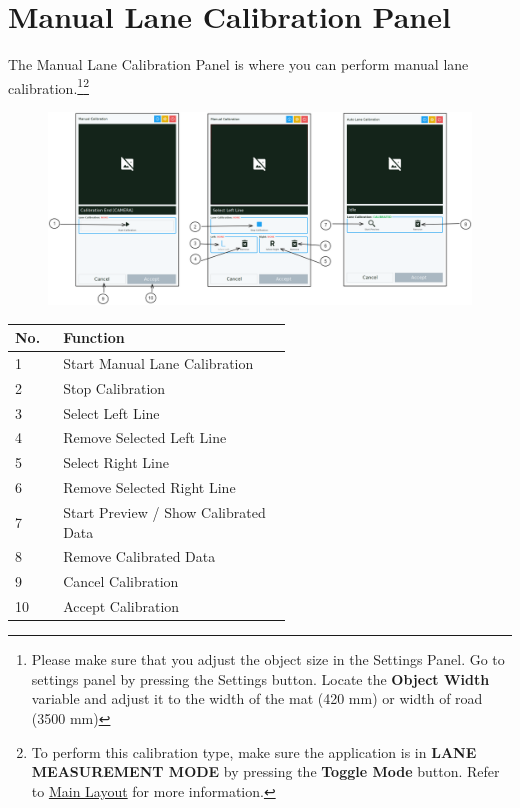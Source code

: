 \pagebreak
\section{Manual Lane Calibration Panel}
\label{sec:manual-lane-calibration-panel}

The Manual Lane Calibration Panel is where you can perform manual lane calibration.\footnote{Please make sure that you adjust the object size in the Settings Panel. Go to settings panel by pressing the Settings button. Locate the \textbf{Object Width} variable and adjust it to the width of the mat (420 mm) or width of road (3500 mm)}\footnote{To perform this calibration type, make sure the application is in \textbf{LANE MEASUREMENT MODE} by pressing the \textbf{Toggle Mode} button. Refer to \hyperref[sec:main-layout]{Main Layout} for more information.}

\begin{figure}[H]
    \centering
    \includegraphics[width=\textwidth]{texs/chapter1/image/p3.png}
\end{figure}

\begin{table}[!ht]
    \centering
    \begin{tabular}{p{0.05\linewidth} | p{0.5\linewidth}}
        \hline
        \textbf{No.} & \textbf{Function}                    \\ \hline
        1            & Start Manual Lane Calibration        \\ \hline
        2            & Stop Calibration                     \\ \hline
        3            & Select Left Line                     \\ \hline
        4            & Remove Selected Left Line            \\ \hline
        5            & Select Right Line                    \\ \hline
        6            & Remove Selected Right Line           \\ \hline
        7            & Start Preview / Show Calibrated Data \\ \hline
        8            & Remove Calibrated Data               \\ \hline
        9            & Cancel Calibration                   \\ \hline
        10           & Accept Calibration                   \\ \hline
    \end{tabular}
\end{table}

